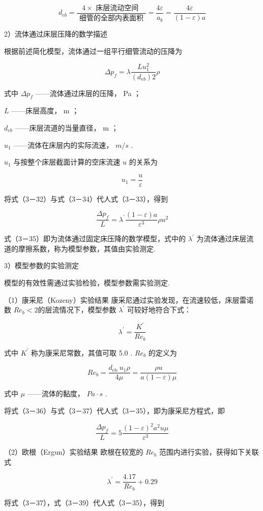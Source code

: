 \documentclass[
]{article}
\begin{document}
\[d_{eb} = \frac{4 \times \text{~床层流动空间~}}{\text{~细管的全部内表面积~}} = \frac{4\varepsilon}{a_{b}} = \frac{4\varepsilon}{(1 - \varepsilon)a}\]

2）流体通过床层压降的数学描述

根据前述简化模型，流体通过一组平行细管流动的压降为

\[\Delta p_{f} = \lambda\frac{Lu_{1}^{2}}{\left( d_{eb} \right)2}\rho\]

式中 \(\Delta p_{f}\) ------流体通过床层的压降， Pa ；

\(L\) ------床层高度， m ；

\(d_{eb}\) ------床层流道的当量直径， m ；

\(u_{1}\) ------流体在床层内的实际流速， \(m/s\) . 

\(u_{1}\) 与按整个床层截面计算的空床流速 \(u\) 的关系为

\[u_{1} = \frac{u}{\varepsilon}\]

将式（3－32）与式（3－34）代人式（3－33），得到

\[\frac{\Delta p_{f}}{L} = \lambda^{'}\frac{(1 - \varepsilon)a}{\varepsilon^{3}}\rho u^{2}\]

式（3－35）即为流体通过固定床压降的数学模型，式中的 \(\lambda^{'}\)
为流体通过床层流道的摩擦系数，称为模型参数，其值由实验测定. 

3）模型参数的实验测定

模型的有效性需通过实验检验，模型参数需实验测定. 

（1）康采尼（Kozeny）实验结果 康采尼通过实验发现，在流速较低，床层雷诺数
\(Re_{b} < 2\)的层流情况下，模型参数 \(\lambda^{'}\) 可较好地符合下式：

\[\lambda^{'} = \frac{K^{'}}{Re_{b}}\]

式中 \(K^{'}\) 称为康采尼常数，其值可取 5.0 .  \(Re_{b}\) 的定义为

\[Re_{b} = \frac{d_{\text{eb}\text{~}}u_{1}\rho}{4\mu} = \frac{\rho u}{a(1 - \varepsilon)\mu}\]

式中 \(\mu\) ------流体的黏度， \(Pa \cdot s\) . 

将式（3－36）与式（3－37）代人式（3－35），即为康采尼方程式，即

\[\frac{\Delta p_{f}}{L} = 5\frac{(1 - \varepsilon)^{2}a^{2}u\mu}{\varepsilon^{3}}\]

（2）欧根（Ergun）实验结果 欧根在较宽的 \(Re_{b}\)
范围内进行实验，获得如下关联式

\[\lambda^{'} = \frac{4.17}{Re_{b}} + 0.29\]

将式（3－37），式（3－39）代人式（3－35），得到
\end{document}
